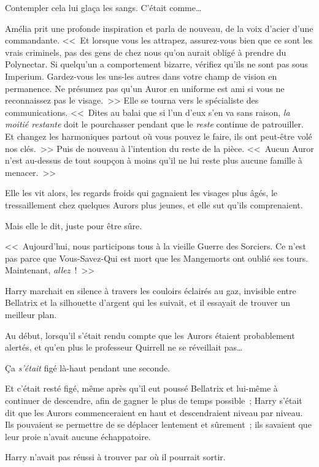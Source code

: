 Contempler cela lui glaça les sangs. C'était comme…

Amélia prit une profonde inspiration et parla de nouveau, de la voix d'acier d'une commandante. <<~Et lorsque vous les attrapez, assurez-vous bien que ce sont les vrais criminels, pas des gens de chez nous qu'on aurait obligé à prendre du Polynectar. Si quelqu'un a comportement bizarre, vérifiez qu'ils ne sont pas sous Imperium. Gardez-vous les uns-les autres dans votre champ de vision en permanence. Ne présumez pas qu'un Auror en uniforme est ami si vous ne reconnaissez pas le visage.~>> Elle se tourna vers le spécialiste des communications. <<~Dites au balai que si l'un d'eux s'en va sans raison, \emph{la moitié restante} doit le pourchasser pendant que le \emph{reste} continue de patrouiller. Et changez les harmoniques partout où vous pouvez le faire, ils ont peut-être volé nos clés.~>> Puis de nouveau à l'intention du reste de la pièce. <<~Aucun Auror n'est au-dessus de tout soupçon à moins qu'il ne lui reste plus aucune famille à menacer.~>>

Elle les vit alors, les regards froids qui gagnaient les visages plus âgés, le tressaillement chez quelques Aurors plus jeunes, et elle sut qu'ils comprenaient.

Mais elle le dit, juste pour être sûre.

<<~Aujourd'hui, nous participons tous à la vieille Guerre des Sorciers. Ce n'est pas parce que Vous-Savez-Qui est mort que les Mangemorts ont oublié ses tours. Maintenant, \emph{allez}~!~>>

\later

Harry marchait en silence à travers les couloirs éclairés au gaz, invisible entre Bellatrix et la silhouette d'argent qui les suivait, et il essayait de trouver un meilleur plan.

Au début, lorsqu'il s'était rendu compte que les Aurors étaient probablement alertés, et qu'en plus le professeur Quirrell ne se réveillait pas…

Ça \emph{s'était} figé là-haut pendant une seconde.

Et c'était resté figé, même après qu'il eut poussé Bellatrix et lui-même à continuer de descendre, afin de gagner le plus de temps possible~; Harry s'était dit que les Aurors commenceraient en haut et descendraient niveau par niveau. Ils pouvaient se permettre de se déplacer lentement et sûrement~; ils savaient que leur proie n'avait aucune échappatoire.

Harry n'avait pas réussi à trouver par où il pourrait sortir.

